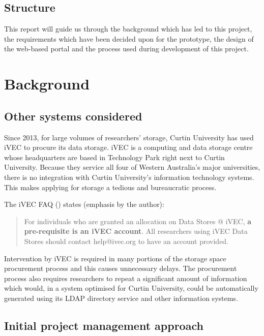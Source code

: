 \documentclass[a4paper,titlepage,12pt]{article}
\let\stdsection\section
\renewcommand\section{\newpage\stdsection}
\begin{document}
\subsection{Structure}

This report will guide us through the background which has led to this project,
the requirements which have been decided upon for the prototype, the design of
the web-based portal and the process used during development of this project.

\section{Background}

\subsection{Other systems considered}

Since 2013, for large volumes of researchers' storage, Curtin University has
used iVEC to procure its data storage. iVEC is a computing and data storage
centre whose headquarters are based in Technology Park right next to Curtin
University. Because they service all four of Western Australia's major
universities, there is no integration with Curtin University's information
technology systems. This makes applying for storage a tedious and bureaucratic
process.

The iVEC FAQ (\cite{iVEC2013}) states (emphasis by the author):

\begin{quote}
	For individuals who are granted an allocation on Data Stores @ iVEC,
	\textbf{a pre-requisite is an iVEC account}. All researchers using iVEC
	Data Stores should contact help@ivec.org to have an account provided.
\end{quote}

Intervention by iVEC is required in many portions of the storage space
procurement process and this causes unnecessary delays. The procurement process
also requires researchers to repeat a significant amount of information which
would, in a system optimised for Curtin University, could be automatically
generated using its LDAP directory service and other information systems.

\subsection{Initial project management approach}
\end{document}
